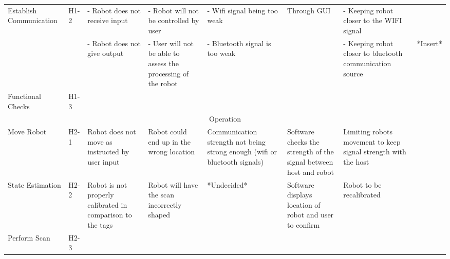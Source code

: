 \documentclass[12pt]{article}
\begin{document}
{\begin{landscape}
\begin{tabularx}{\linewidth}{|p{3cm}|p{1cm}|p{3.25cm}|p{3.25cm}|p{3cm}|p{3cm}|p{4cm}|X|}
\hline
Establish Communication & H1-2 & - Robot does not receive input & - Robot will not be controlled by user & - Wifi signal being too weak & Through GUI & - Keeping robot closer to the WIFI signal & {}\\
{} & {} & - Robot does not give output & - User will not be able to assess the processing of the robot & - Bluetooth signal is too weak  & {} & - Keeping robot closer to bluetooth communication source  & *Insert*\\

\hline
Functional Checks & H1-3 & {} & {} & {} & {} & {}& {}\\

\hline
\multicolumn{8}{|c|}{Operation}\\

\hline
Move Robot & H2-1 & Robot does not move as instructed by user input & Robot could end up in the wrong location & Communication strength not being strong enough (wifi or bluetooth signals) & Software checks the strength of the signal between host and robot &Limiting robots movement to keep signal strength with the host & {}\\ %

\hline
State Estimation & H2-2 & Robot is not properly calibrated in comparison to the tags & Robot will have the scan incorrectly shaped & *Undecided* & Software displays location of robot and user to confirm & Robot to be recalibrated & {}\\ %

\hline
Perform Scan & H2-3 & & {} & {} & {} & {}& {}\\
\hline

\end{tabularx}
\end{landscape}
\clearpage%
}
\end{document}
